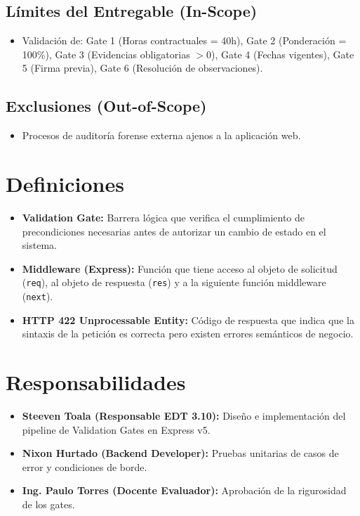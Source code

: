\documentclass[12pt,a4paper]{article}
\begin{document}
\subsection{Límites del Entregable (In-Scope)}
\begin{itemize}[leftmargin=1.5em, itemsep=2pt]
    \item Validación de: Gate 1 (Horas contractuales = 40h), Gate 2 (Ponderación = 100\%), Gate 3 (Evidencias obligatorias $>0$), Gate 4 (Fechas vigentes), Gate 5 (Firma previa), Gate 6 (Resolución de observaciones).
\end{itemize}
\subsection{Exclusiones (Out-of-Scope)}
\begin{itemize}[leftmargin=1.5em, itemsep=2pt]
    \item Procesos de auditoría forense externa ajenos a la aplicación web.
\end{itemize}

\section{Definiciones}
\begin{itemize}[leftmargin=1.5em, itemsep=2pt]
    \item \textbf{Validation Gate:} Barrera lógica que verifica el cumplimiento de precondiciones necesarias antes de autorizar un cambio de estado en el sistema.
    \item \textbf{Middleware (Express):} Función que tiene acceso al objeto de solicitud (\texttt{req}), al objeto de respuesta (\texttt{res}) y a la siguiente función middleware (\texttt{next}).
    \item \textbf{HTTP 422 Unprocessable Entity:} Código de respuesta que indica que la sintaxis de la petición es correcta pero existen errores semánticos de negocio.
\end{itemize}

\section{Responsabilidades}
\begin{itemize}[leftmargin=1.5em, itemsep=2pt]
    \item \textbf{Steeven Toala (Responsable EDT 3.10):} Diseño e implementación del pipeline de Validation Gates en Express v5.
    \item \textbf{Nixon Hurtado (Backend Developer):} Pruebas unitarias de casos de error y condiciones de borde.
    \item \textbf{Ing. Paulo Torres (Docente Evaluador):} Aprobación de la rigurosidad de los gates.
\end{itemize}
\end{document}
